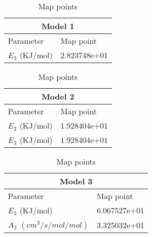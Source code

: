 \begin{table}[H]
\caption {Map points} \label{tab:map points-data}
\begin{center}

\begin{tabular}{ |p{3cm}|p{3cm}|}
 \hline
 \multicolumn{2}{|c|}{Model 1} \\
 \hline
    Parameter   & Map point \\
    \hline
    $E_3$ (KJ/mol)     &  2.823748e+01  \\
 \hline
\end{tabular}
   \newline
\vspace*{0.7 cm}
\newline
\begin{tabular}{ |p{3cm}|p{3cm}|}
 \hline
 \multicolumn{2}{|c|}{Model 2} \\
\hline
    Parameter   & Map point \\
    \hline
    $E_2$ (KJ/mol)     &  1.928404e+01  \\
    $E_3$ (KJ/mol)     &  1.928404e+01  \\
\hline
\end{tabular}
  \newline
\vspace*{0.7 cm}
\newline
  
\begin{tabular}{ |p{4cm}|p{3cm}|}
 \hline
 \multicolumn{2}{|c|}{Model 3} \\
\hline
    Parameter   & Map point \\
    \hline
    $E_3$ (KJ/mol)     &  6.067527e+01  \\
    $A_3$ $(cm^3/s/mol/mol)$     &  3.325032e+01  \\
 \hline
\end{tabular}
 \end{center}
\end{table}







